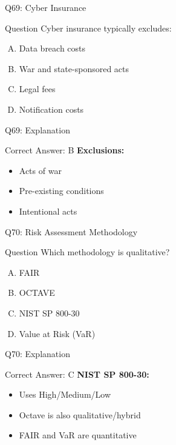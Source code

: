 \documentclass{beamer}
\begin{document}
			\begin{frame}{Q69: Cyber Insurance}
				\begin{block}{Question}
					Cyber insurance typically excludes:
				\end{block}
				\begin{enumerate}[(A)]
					\item Data breach costs
					\item War and state-sponsored acts
					\item Legal fees
					\item Notification costs
				\end{enumerate}
			\end{frame}
			\begin{frame}{Q69: Explanation}
				\begin{block}{Correct Answer: B}
					\textbf{Exclusions:}
					\begin{itemize}
						\item Acts of war
						\item Pre-existing conditions
						\item Intentional acts
					\end{itemize}
				\end{block}
			\end{frame}
			
			\begin{frame}{Q70: Risk Assessment Methodology}
				\begin{block}{Question}
					Which methodology is qualitative?
				\end{block}
				\begin{enumerate}[(A)]
					\item FAIR
					\item OCTAVE
					\item NIST SP 800-30
					\item Value at Risk (VaR)
				\end{enumerate}
			\end{frame}
			\begin{frame}{Q70: Explanation}
				\begin{block}{Correct Answer: C}
					\textbf{NIST SP 800-30:}
					\begin{itemize}
						\item Uses High/Medium/Low
						\item Octave is also qualitative/hybrid
						\item FAIR and VaR are quantitative
					\end{itemize}
				\end{block}
			\end{frame}
			
\end{document}
